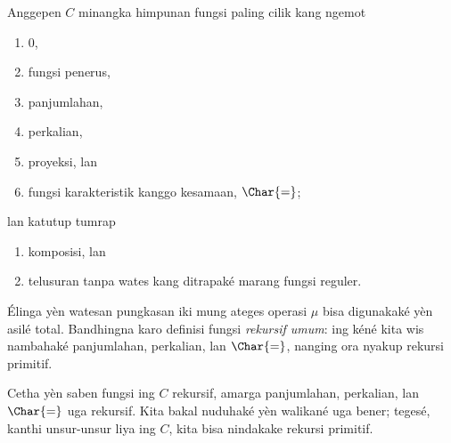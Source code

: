 \documentclass[../../../include/open-logic-section]{subfiles}
\begin{document}

Anggepen $C$ minangka himpunan fungsi paling cilik kang ngemot
\begin{enumerate}
\item $0$,
\item fungsi penerus,
\item panjumlahan,
\item perkalian,
\item proyeksi, lan
\item fungsi karakteristik kanggo kesamaan, $\Char{=}$;
\end{enumerate}
lan katutup tumrap
\begin{enumerate}
\item komposisi, lan
\item telusuran tanpa wates kang ditrapaké marang
fungsi reguler.
\end{enumerate}
Élinga yèn watesan pungkasan iki mung ateges operasi
$\mu$ bisa digunakaké yèn asilé total. Bandhingna karo
definisi fungsi \emph{rekursif umum}: ing kéné kita wis
nambahaké panjumlahan, perkalian, lan $\Char{=}$,
nanging ora nyakup rekursi primitif.

Cetha yèn saben fungsi ing $C$ rekursif, amarga panjumlahan,
perkalian, lan $\Char{=}$ uga rekursif. Kita bakal nuduhaké
yèn walikané uga bener; tegesé, kanthi unsur-unsur liya
ing $C$, kita bisa nindakake rekursi primitif.
\end{document}
